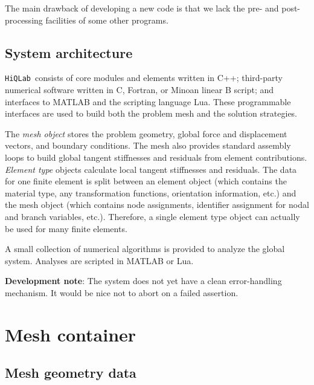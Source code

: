 \documentclass{article}
\newcommand{\hiq}{\texttt{HiQLab}}
\newcommand{\devnote}[1]{%
  \begin{trivlist}
  \item\textbf{Development note}: #1
  \end{trivlist}}
\begin{document}
The main drawback of developing a new code is that we lack the pre-
and post-processing facilities of some other programs.


\subsection{System architecture}
\label{section-system-arch}

\hiq\ consists of core modules and elements written in
C++; third-party numerical software written in C, Fortran, or Minoan
linear B script; and interfaces to MATLAB and the
scripting language Lua.  These programmable interfaces are used to
build both the problem mesh and the solution strategies.

The \emph{mesh object} stores the problem geometry, global force and
displacement vectors, and boundary conditions.  The mesh also provides
standard assembly loops to build global tangent stiffnesses and
residuals from element contributions.
\emph{Element type} objects calculate local tangent stiffnesses
and residuals.  The data for one finite element is split between
an element object (which contains the material type, any
transformation functions, orientation information, etc.) and the mesh
object (which contains node assignments, identifier assignment
for nodal and branch variables, etc.).  Therefore, a single element
type object can actually be used for many finite elements.

A small collection of numerical algorithms is provided to analyze the
global system.  Analyses are scripted in MATLAB or Lua.

\devnote{The system does not yet have a clean error-handling
  mechanism.  It would be nice not to abort on a failed assertion.}


\section{Mesh container}
\label{section-mesh}

\subsection{Mesh geometry data}
\end{document}
